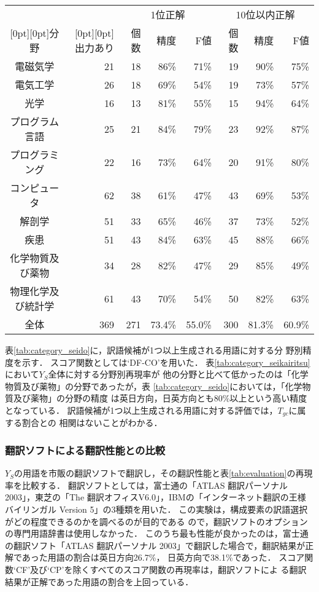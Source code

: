 \documentclass[japanese]{jnlp_1.3a}
\begin{document}
\begin{table}[t]
 \begin{tabular}{|c|r|r|r|r|r|r|r|}
  \hline
  & & \multicolumn{3}{|c|}{1位正解} & \multicolumn{3}{|c|}{10位以内正解} \\
      \cline{3-8}
      \raisebox{0.5\normalbaselineskip}[0pt][0pt]{分野} & \raisebox{0.5\normalbaselineskip}[0pt][0pt]{出力あり} 
	& 個数 & 精度 & F値 & 個数 & 精度 & F値\\
  \hline \hline
  電磁気学           & 21 & 18 & 86\% & 71\% & 19 & 90\% & 75\% \\
  電気工学           & 26 & 18 & 69\% & 54\% & 19 & 73\% & 57\% \\
  光学               & 16 & 13 & 81\% & 55\% & 15 & 94\% & 64\% \\
  プログラム言語     & 25 & 21 & 84\% & 79\% & 23 & 92\% & 87\% \\
  プログラミング     & 22 & 16 & 73\% & 64\% & 20 & 91\% & 80\% \\
  コンピュータ       & 62 & 38 & 61\% & 47\% & 43 & 69\% & 53\% \\
  解剖学             & 51 & 33 & 65\% & 46\% & 37 & 73\% & 52\% \\
  疾患               & 51 & 43 & 84\% & 63\% & 45 & 88\% & 66\% \\
  化学物質及び薬物   & 34 & 28 & 82\% & 47\% & 29 & 85\% & 49\% \\
  物理化学及び統計学 & 61 & 43 & 70\% & 54\% & 50 & 82\% & 63\% \\
  \hline	         	         
  全体               & 369 & 271 & 73.4\% & 55.0\% & 300 & 81.3\% &60.9\%\\
  \hline
 \end{tabular}
\end{table}

表\ref{tab:category_seido}に，訳語候補が1つ以上生成される用語に対する分
野別精度を示す．
スコア関数としては`DF-CO'を用いた．
表\ref{tab:category_seikairitsu}において$Y_S$全体に対する分野別再現率が
他の分野と比べて低かったのは「化学物質及び薬物」の分野であったが，表
\ref{tab:category_seido}においては，「化学物質及び薬物」の分野の精度
は英日方向，日英方向とも80\%以上という高い精度となっている．
訳語候補が1つ以上生成される用語に対する評価では，$T_{gc}$に属する割合との
相関はないことがわかる．

\subsubsection*{翻訳ソフトによる翻訳性能との比較}
$Y_S$の用語を市販の翻訳ソフトで翻訳し，その翻訳性能と表\ref{tab:evaluation}の再現率を比較する．
翻訳ソフトとしては，富士通の「ATLAS 翻訳パーソナル 2003」，東芝の「The 
翻訳オフィスV6.0」，IBMの「インターネット翻訳の王様バイリンガル Version
5」の3種類を用いた．
この実験は，構成要素の訳語選択がどの程度できるのかを調べるのが目的である
ので，翻訳ソフトのオプションの専門用語辞書は使用しなかった．
このうち最も性能が良かったのは，富士通の翻訳ソフト「ATLAS 翻訳パーソナル 
2003」で翻訳した場合で，翻訳結果が正解であった用語の割合は英日方向26.7\%，
日英方向で38.1\%であった．
スコア関数`CF'及び`CP'を除くすべてのスコア関数の再現率は，翻訳ソフトによ
る翻訳結果が正解であった用語の割合を上回っている．
\end{document}
